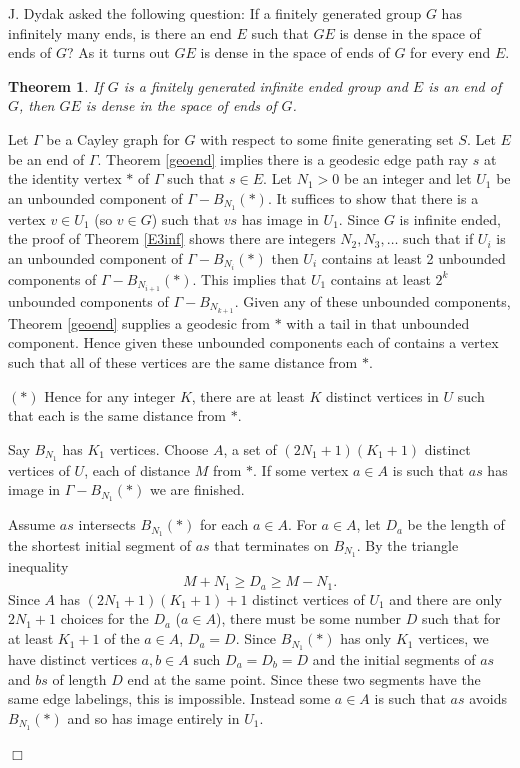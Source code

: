 \documentclass[12pt]{article}
\newtheorem{theorem}{Theorem}[subsection]
\newenvironment{proof}{\addvspace{12pt}\noindent{\bf Proof:}}{
$\Box$\par\addvspace{12pt}}
\begin{document}
J. Dydak asked the following question: If a finitely generated group $G$ has infinitely many ends, is there an end $E$ such that $GE$ is dense in the space of ends of $G$? As it turns out $GE$ is dense in the space of ends of $G$ for every end $E$.
\begin{theorem}
If $G$ is a finitely generated infinite ended group and $E$ is an end of $G$, then $GE$ is dense in the space of ends of $G$.
\end{theorem}
\begin{proof}
Let $\Gamma$ be a Cayley graph for $G$ with respect to some finite generating set $S$. Let $E$ be an end of $\Gamma$. Theorem \ref{geoend} implies there is a geodesic edge path ray $s$ at the identity vertex $\ast$ of $\Gamma$ such that $s\in E$. Let $N_1>0$ be an integer and let $U_1$ be an unbounded component of $\Gamma-B_{N_1}(\ast)$. It suffices to show that there is a vertex $v\in U_1$ (so $v\in G$) such that $vs$ has image in $U_1$. Since $G$ is infinite ended, the proof of Theorem \ref{E3inf} shows there are integers $N_2,N_3,\ldots $ such that if $U_i$ is an unbounded component of $\Gamma-B_{N_i}(\ast)$ then $U_i$ contains at least 2 unbounded components of $\Gamma-B_{N_{i+1}}(\ast)$. This implies that $U_1$ contains at least $2^k$ unbounded components of $\Gamma-B_{N_{k+1}}$. Given any of these unbounded components, Theorem \ref{geoend} supplies a geodesic from $\ast$ with a tail in that unbounded component. Hence given these unbounded components each of contains a vertex such that all of these vertices are the same distance from $\ast$.
 
\medskip

\noindent $(\ast)$ Hence for any integer $K$, there are at least $K$ distinct vertices in $U$ such that each is the same distance from $\ast$. 

\medskip

Say $B_{N_1}$ has $K_1$ vertices. Choose $A$, a set of $(2N_1+1)(K_1+1)$ distinct vertices of $U$, each of distance $M$ from $\ast$. If some vertex $a\in A$ is such that $as$ has image in $\Gamma-B_{N_1}(\ast)$ we are finished. 

Assume $as$ intersects $B_{N_1}(\ast)$ for each $a\in A$. For $a\in A$, let $D_a$ be the length of the shortest initial segment of $as$ that terminates on $B_{N_1}$. By the triangle inequality
$$M+N_1\geq D_a\geq M-N_1.$$
Since $A$ has $(2N_1+1)(K_1+1)+1$ distinct vertices of $U_1$ and there are only $2N_1+1$ choices for the $D_a$ ($a\in A$), there must be some number $D$ such that for at least $K_1+1$ of the $a\in A$, $D_a=D$. Since $B_{N_1}(\ast)$ has only $K_1$ vertices, we have distinct vertices $a,b\in A$ such $D_a=D_b=D$ and the initial segments of $as$ and $bs$ of length $D$ end at the same point. Since these two segments have the same edge labelings, this is impossible. Instead some $a\in A$ is such that $as$ avoids $B_{N_1}(\ast)$ and so has image entirely in $U_1$. 
\end{proof}
\end{document}
